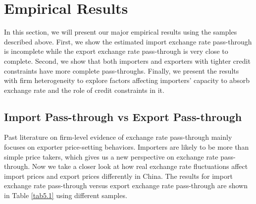 \chapter{Empirical Results}\label{sec-5.results}
In this section, we will present our major empirical results using the samples described above. First, we show the estimated import exchange rate pass-through is incomplete while the export exchange rate pass-through is very close to complete. Second, we show that both importers and exporters with tighter credit constraints have more complete pass-throughs. Finally, we present the results with firm heterogeneity to explore factors affecting importers' capacity to absorb exchange rate and the role of credit constraints in it.

\section{Import Pass-through vs Export Pass-through}

Past literature on firm-level evidence of exchange rate pass-through mainly focuses on exporter price-setting behaviors. Importers are likely to be more than simple price takers, which gives us a new perspective on exchange rate pass-through. Now we take a closer look at how real exchange rate fluctuations affect import prices and export prices differently in China. The results for import exchange rate pass-through versus export exchange rate pass-through are shown in Table \ref{tab5.1} using different samples.

